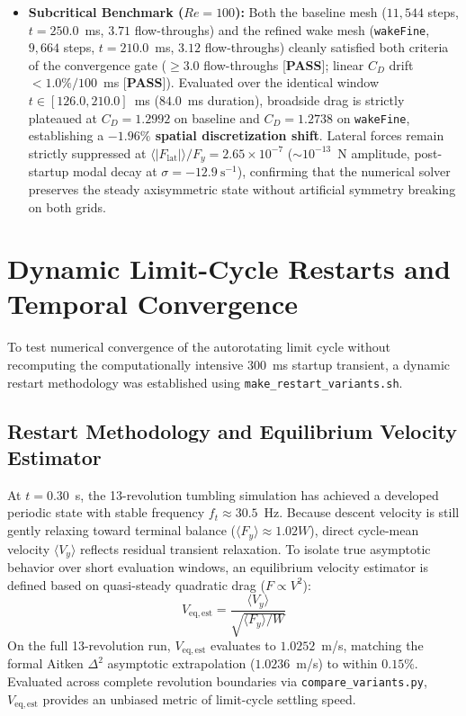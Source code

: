 \documentclass[11pt,a4paper]{article}
\begin{document}
\begin{itemize}
    \item \textbf{Subcritical Benchmark ($Re = 100$):} Both the baseline mesh ($11,544$ steps, $t = 250.0$~ms, $3.71$ flow-throughs) and the refined wake mesh (\texttt{wakeFine}, $9,664$ steps, $t = 210.0$~ms, $3.12$ flow-throughs) cleanly satisfied both criteria of the convergence gate ($\ge 3.0$ flow-throughs [\textbf{PASS}]; linear $C_D$ drift $< 1.0\% / 100$~ms [\textbf{PASS}]). Evaluated over the identical window $t \in [126.0, 210.0]$~ms ($84.0$~ms duration), broadside drag is strictly plateaued at $C_D = 1.2992$ on baseline and $C_D = 1.2738$ on \texttt{wakeFine}, establishing a \textbf{$-1.96\%$ spatial discretization shift}. Lateral forces remain strictly suppressed at $\langle |F_{\mathrm{lat}}| \rangle / F_y = 2.65 \times 10^{-7}$ ($\sim 10^{-13}$~N amplitude, post-startup modal decay at $\sigma = -12.9\ \mathrm{s}^{-1}$), confirming that the numerical solver preserves the steady axisymmetric state without artificial symmetry breaking on both grids.
\end{itemize}

\section{Dynamic Limit-Cycle Restarts and Temporal Convergence}

To test numerical convergence of the autorotating limit cycle without recomputing the computationally intensive $300$~ms startup transient, a dynamic restart methodology was established using \texttt{make\_restart\_variants.sh}.

\subsection{Restart Methodology and Equilibrium Velocity Estimator}
At $t = 0.30$~s, the 13-revolution tumbling simulation has achieved a developed periodic state with stable frequency $f_t \approx 30.5$~Hz. Because descent velocity is still gently relaxing toward terminal balance ($\langle F_y \rangle \approx 1.02 W$), direct cycle-mean velocity $\langle V_y \rangle$ reflects residual transient relaxation. To isolate true asymptotic behavior over short evaluation windows, an equilibrium velocity estimator is defined based on quasi-steady quadratic drag ($F \propto V^2$):
\begin{equation}
V_{\mathrm{eq,est}} = \frac{\langle V_y \rangle}{\sqrt{\langle F_y \rangle / W}}
\end{equation}
On the full 13-revolution run, $V_{\mathrm{eq,est}}$ evaluates to $1.0252$~m/s, matching the formal Aitken $\Delta^2$ asymptotic extrapolation ($1.0236$~m/s) to within $0.15\%$. Evaluated across complete revolution boundaries via \texttt{compare\_variants.py}, $V_{\mathrm{eq,est}}$ provides an unbiased metric of limit-cycle settling speed.
\end{document}
